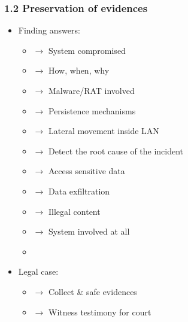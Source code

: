 \begin{frame}
  \frametitle{1.2 Preservation of evidences}
  \begin{itemize}
      \item Finding answers:
      \begin{itemize}
          \item[] $\to$ System compromised
          \item[] $\to$ How, when, why
          \item[] $\to$ Malware/RAT involved
          \item[] $\to$ Persistence mechanisms
          \item[] $\to$ Lateral movement inside LAN
          \item[] $\to$ Detect the root cause of the incident
          \item[] $\to$ Access sensitive data
          \item[] $\to$ Data exfiltration
          \item[] $\to$ Illegal content
          \item[] $\to$ System involved at all
          \item[]
      \end{itemize}
      \item Legal case:
      \begin{itemize}
	  \item[] $\to$ Collect \& safe evidences
	  \item[] $\to$ Witness testimony for court
      \end{itemize}
  \end{itemize}
\end{frame}


